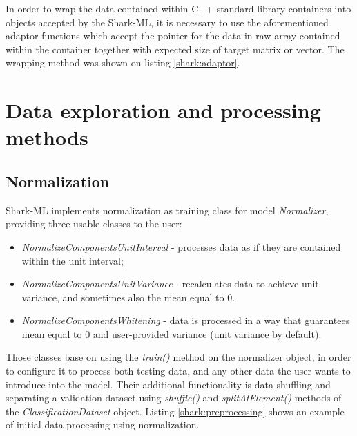 \newpage
{}

In order to wrap the data contained within C++ standard library containers into objects accepted by the Shark-ML, it is necessary to use the aforementioned adaptor functions which accept the pointer for the data in raw array contained within the container together with expected size of target matrix or vector. The wrapping method was shown on listing \ref{shark:adaptor}. 


\section{Data exploration and processing methods}

\subsection{Normalization}

Shark-ML implements normalization as training class for model \textit{Normalizer}, providing three usable classes to the user:

\begin{itemize}
	\item \textit{NormalizeComponentsUnitInterval} - processes data as if they are contained within the unit interval;
	\item \textit{NormalizeComponentsUnitVariance} - recalculates data to achieve unit variance, and sometimes also the mean equal to 0.
	\item \textit{NormalizeComponentsWhitening} - data is processed in a way that guarantees mean equal to 0 and user-provided variance (unit variance by default).
\end{itemize}

Those classes base on using the \textit{train()} method on the normalizer object, in order to configure it to process both testing data, and any other data the user wants to introduce into the model. Their additional functionality is data shuffling and separating a validation dataset using \textit{shuffle()} and \textit{splitAtElement()} methods of the \textit{ClassificationDataset} object. Listing \ref{shark:preprocessing} shows an example of initial data processing using normalization.




